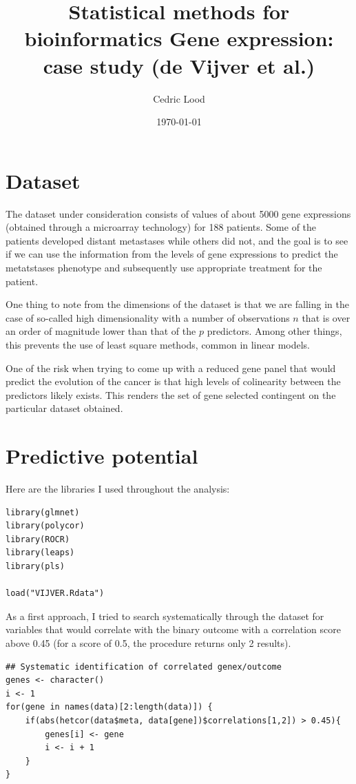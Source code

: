 \documentclass[11pt, a4paper]{article}
\title{Statistical methods for bioinformatics \linebreak Gene expression: case study (de Vijver et al.)}
\author{Cedric Lood}
\date{\today}
\begin{document}
\maketitle


\graphicspath{ {figures/} }
\setlength{\droptitle}{-5em} 
\setlength{\parindent}{0cm}

\section{Dataset}
\label{sec-1}

The dataset under consideration consists of values of about 5000 gene
expressions (obtained through a microarray technology) for 188
patients. Some of the patients developed distant metastases while
others did not, and the goal is to see if we can use the information
from the levels of gene expressions to predict the metatstases
phenotype and subsequently use appropriate treatment for the patient.

One thing to note from the dimensions of the dataset is that we are
falling in the case of so-called high dimensionality with a number of
observations $n$ that is over an order of magnitude lower than that of
the $p$ predictors. Among other things, this prevents the use of least
square methods, common in linear models. 

One of the risk when trying to come up with a reduced gene panel that
would predict the evolution of the cancer is that high levels of
colinearity between the predictors likely exists. This renders the set
of gene selected contingent on the particular dataset obtained.
\section{Predictive potential}
\label{sec-2}

Here are the libraries I used throughout the analysis:

\begin{verbatim}
library(glmnet)
library(polycor)
library(ROCR)
library(leaps)
library(pls)

load("VIJVER.Rdata")
\end{verbatim}

As a first approach, I tried to search systematically through the
dataset for variables that would correlate with the binary outcome
with a correlation score above 0.45 (for a score of 0.5, the procedure
returns only 2 results).


\begin{verbatim}
## Systematic identification of correlated genex/outcome
genes <- character()
i <- 1
for(gene in names(data)[2:length(data)]) {
    if(abs(hetcor(data$meta, data[gene])$correlations[1,2]) > 0.45){
        genes[i] <- gene
        i <- i + 1
    }
}
\end{verbatim}
\end{document}
